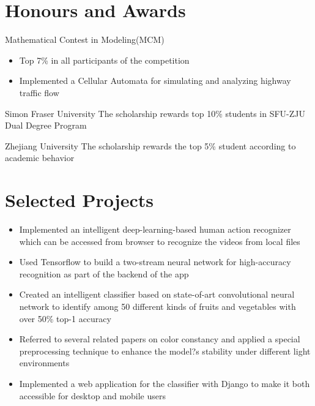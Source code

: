 \documentclass[11pt,a4paper,sans]{moderncv}   %
\begin{document}
\section{Honours and Awards}
{Mathematical Contest in Modeling(MCM)}
{}
{}
{
\begin{itemize}
\item Top 7\% in all participants of the competition
\item Implemented a Cellular Automata for simulating and analyzing highway traffic flow
\end{itemize}}

{Simon Fraser University}
{}
{}
{The scholarship rewards top 10\% students in SFU-ZJU Dual Degree Program}

{Zhejiang University}
{}
{}
{The scholarship rewards the top 5\% student according to academic behavior}

\section{Selected Projects}

{%
\begin{itemize}%
\item Implemented an intelligent deep-learning-based human action recognizer which can be accessed from browser to recognize the videos from local files
%
\item Used Tensorflow to build a two-stream neural network for high-accuracy recognition as part of the backend of the app
\end{itemize}
}

{%
\begin{itemize}%
\item Created an intelligent classifier based on state-of-art convolutional neural network to identify among 50 different kinds of fruits and vegetables with over 50\% top-1 accuracy%
\item Referred to several related papers on color constancy and applied a special preprocessing technique to enhance the model?s stability under different light environments
\item Implemented a web application for the classifier with Django to make it both accessible for desktop and mobile users
\end{itemize}
}
\end{document}
